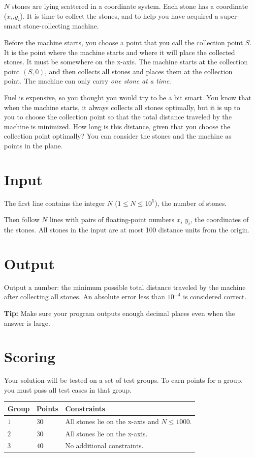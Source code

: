 
$N$ stones are lying scattered in a coordinate system. Each stone has a coordinate ($x_i$,$y_i$). It is time to collect the stones, and to help you have acquired a super-smart stone-collecting machine.

Before the machine starts, you choose a point that you call the collection point $S$. It is the point where the machine starts and where it will place the collected stones. It must be somewhere on the x-axis. The machine starts at the collection point $(S,0)$, and then collects all stones and places them at the collection point. The machine can only carry \emph{one stone at a time}.

Fuel is expensive, so you thought you would try to be a bit smart. You know that when the machine starts, it always collects all stones optimally, but it is up to you to choose the collection point so that the total distance traveled by the machine is minimized. How long is this distance, given that you choose the collection point optimally? You can consider the stones and the machine as points in the plane.

\section*{Input}
The first line contains the integer $N$ ($1 \leq N \leq 10^5$), the number of stones.

Then follow $N$ lines with pairs of floating-point numbers $x_i$ $y_i$, the coordinates of the stones. All stones in
the input are at most 100 distance units from the origin.

\section*{Output}
Output a number: the minimum possible total distance traveled by the machine after collecting all stones. An absolute error less than $10^{-4}$ is considered correct.

{\bf Tip:} Make sure your program outputs enough decimal places even when the answer is large.

\section*{Scoring}
Your solution will be tested on a set of test groups.
To earn points for a group, you must pass all test cases in that group.

\noindent
\begin{tabular}{| l | l | p{12cm} |}
  \hline
  \textbf{Group} & \textbf{Points} & \textbf{Constraints} \\ \hline
  $1$    & $30$       & All stones lie on the x-axis and $N \leq 1000$. \\ \hline
  $2$    & $30$       & All stones lie on the x-axis. \\ \hline
  $3$    & $40$       & No additional constraints. \\ \hline
\end{tabular}


